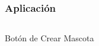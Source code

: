 \documentclass[14pt]{beamer}
\begin{document}
\begin{frame}
\frametitle{Aplicación}

\begin{columns}

\begin{column}{0.5\textwidth}
\begin{center}

\begin{small}


\caption{Botón de Crear Mascota}
\end{small}
\end{center}
\end{column}



\begin{column}{0.5\textwidth}
\begin{center}


\end{center}
\end{column}
\end{columns}
\end{frame}
\end{document}
